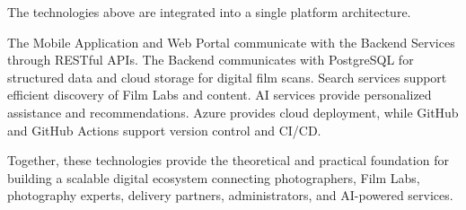 The technologies above are integrated into a single platform architecture.

The Mobile Application and Web Portal communicate with the Backend Services
through RESTful APIs. The Backend communicates with PostgreSQL for structured
data and cloud storage for digital film scans. Search services support
efficient discovery of Film Labs and content. AI services provide
personalized assistance and recommendations. Azure provides cloud deployment,
while GitHub and GitHub Actions support version control and CI/CD.

Together, these technologies provide the theoretical and practical foundation
for building a scalable digital ecosystem connecting photographers, Film Labs,
photography experts, delivery partners, administrators, and AI-powered
services.